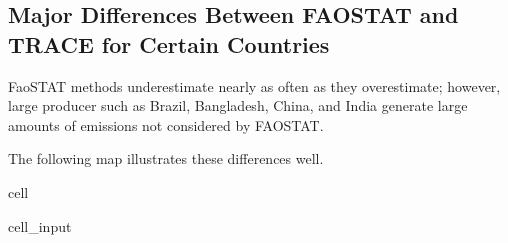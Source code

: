 \documentclass[letterpaper,10pt,english]{jupyterBook}
\begin{document}
\subsection{Major Differences Between FAOSTAT and TRACE for Certain Countries}
\label{\detokenize{notebooks/full_post:major-differences-between-faostat-and-trace-for-certain-countries}}
\sphinxAtStartPar
FaoSTAT methods underestimate nearly as often as they overestimate; however, large producer such as Brazil, Bangladesh, China, and India generate large amounts of emissions not considered by FAOSTAT.

\sphinxAtStartPar
The following map illustrates these differences well.

\begin{sphinxuseclass}{cell}\begin{sphinxVerbatimInput}

\begin{sphinxuseclass}{cell_input}
\begin{sphinxVerbatim}[commandchars=\\\{\}]
    
  
    
         
                         
 
\end{sphinxVerbatim}


\end{sphinxuseclass}
\end{sphinxVerbatimInput}
\end{sphinxuseclass}
\end{document}
